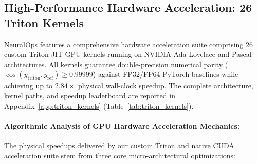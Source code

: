 \documentclass{article}
\begin{document}
\subsection{High-Performance Hardware Acceleration: 26 Triton Kernels}
NeuralOps features a comprehensive hardware acceleration suite comprising 26 custom Triton JIT GPU kernels running on NVIDIA Ada Lovelace and Pascal architectures. All kernels guarantee double-precision numerical parity ($\cos(y_{\text{triton}}, y_{\text{ref}}) \ge 0.99999$) against FP32/FP64 PyTorch baselines while achieving up to $2.84\times$ physical wall-clock speedup. The complete architecture, kernel paths, and speedup leaderboard are reported in Appendix~\ref{app:triton_kernels} (Table~\ref{tab:triton_kernels}).

\paragraph{Algorithmic Analysis of GPU Hardware Acceleration Mechanics:}
The physical speedups delivered by our custom Triton and native CUDA acceleration suite stem from three core micro-architectural optimizations:
\end{document}
